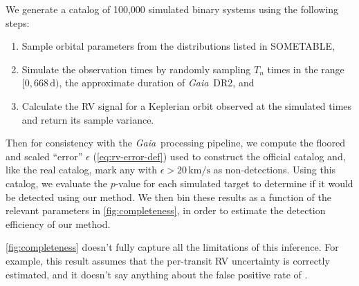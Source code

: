 \documentclass[modern, letterpaper]{aastex631}
\newcommand{\project}[1]{\textsl{#1}}
\newcommand{\Gaia}{\project{Gaia}}
\begin{document}
We generate a catalog of 100,000 simulated binary systems using the following steps:
\begin{enumerate}
	\item Sample orbital parameters from the distributions listed in SOMETABLE,
	\item Simulate the observation times by randomly sampling $T_n$ times in the range $[0, 668\,\mathrm{d})$, the approximate duration of \Gaia\ DR2, and
	\item Calculate the RV signal for a Keplerian orbit observed at the simulated times and return its sample variance.
\end{enumerate}
Then for consistency with the \Gaia\ processing pipeline, we compute the floored and scaled ``error'' $\epsilon$ (\autoref{eq:rv-error-def}) used to construct the official catalog and, like the real catalog, mark any with $\epsilon > 20\,\mathrm{km/s}$ as non-detections.
Using this catalog, we evaluate the $p$-value for each simulated target to determine if it would be detected using our method.
We then bin these results as a function of the relevant parameters in \autoref{fig:completeness}, in order to estimate the detection efficiency of our method.

\autoref{fig:completeness} doesn't fully capture all the limitations of this inference.
For example, this result assumes that the per-transit RV uncertainty is correctly estimated, and it doesn't say anything about the false positive rate of .


\end{document}
